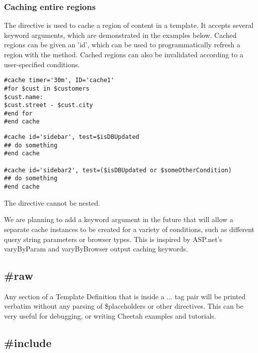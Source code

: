 \subsubsection{Caching entire regions}
\label{output.caching.regions}

The  directive is used to cache a region of content in a template.
It accepts several keyword arguments, which are demonstrated in the examples
below.  Cached regions can be given an 'id', which can be used to
programmatically refresh a region with the 
method.  Cached regions can also be invalidated according to a user-specified
 conditions.

\begin{verbatim}
#cache timer='30m', ID='cache1'
#for $cust in $customers
$cust.name:
$cust.street - $cust.city
#end for
#end cache
\end{verbatim}

\begin{verbatim}
#cache id='sidebar', test=$isDBUpdated
## do something
#end cache

#cache id='sidebar2', test=($isDBUpdated or $someOtherCondition)
## do something
#end cache
\end{verbatim}

The  directive cannot be nested.

We are planning to add a  keyword argument in the future that
will allow a separate cache instances to be created for a variety of conditions,
such as different query string parameters or browser types. This is inspired by
ASP.net's varyByParam and varyByBrowser output caching keywords.


\subsection{\#raw}
\label{directives.raw}

Any section of a Template Definition that is inside a  ...
 tag pair will be printed verbatim without any parsing of
\$placeholders or other directives. This can be very useful for debugging, or
writing Cheetah examples and tutorials.


\subsection{\#include}
\label{directives.include}

